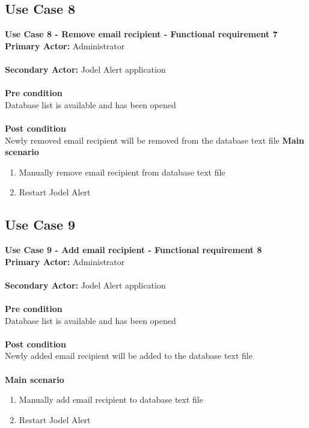 \documentclass[a4paper,12pt]{article}
\begin{document}
\subsection{Use Case 8}
\textbf{Use Case 8 - Remove email recipient - Functional requirement 7}\\
\textbf{Primary Actor:}
Administrator\\\\
\textbf{Secondary Actor:}
Jodel Alert application\\\\
\textbf{Pre condition}\\
Database list is available and has been opened\\\\
\textbf{Post condition}\\
Newly removed email recipient will be removed from the database text file
\clearpage
\textbf{Main scenario}
\begin{enumerate}
	\item Manually remove email recipient from database text file
	\item Restart Jodel Alert
\end{enumerate}

\subsection{Use Case 9}
\textbf{Use Case 9 - Add email recipient - Functional requirement 8}\\
\textbf{Primary Actor:}
Administrator\\\\
\textbf{Secondary Actor:}
Jodel Alert application\\\\
\textbf{Pre condition}\\
Database list is available and has been opened\\\\
\textbf{Post condition}\\
Newly added email recipient will be added to the database text file\\\\
\textbf{Main scenario}
\begin{enumerate}
	\item Manually add email recipient to database text file
	\item Restart Jodel Alert
\end{enumerate}
\end{document}
